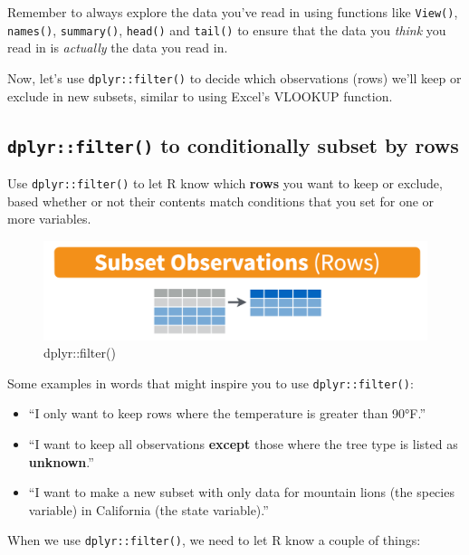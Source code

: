 \documentclass[]{book}
\providecommand{\tightlist}{%
  \setlength{\itemsep}{0pt}\setlength{\parskip}{0pt}}
\begin{document}
Remember to always explore the data you've read in using functions like \texttt{View()}, \texttt{names()}, \texttt{summary()}, \texttt{head()} and \texttt{tail()} to ensure that the data you \emph{think} you read in is \emph{actually} the data you read in.

Now, let's use \texttt{dplyr::filter()} to decide which observations (rows) we'll keep or exclude in new subsets, similar to using Excel's VLOOKUP function.

\hypertarget{dplyrfilter-to-conditionally-subset-by-rows}{%
\subsection{\texorpdfstring{\texttt{dplyr::filter()} to conditionally subset by rows}{dplyr::filter() to conditionally subset by rows}}\label{dplyrfilter-to-conditionally-subset-by-rows}}

Use \texttt{dplyr::filter()} to let R know which \textbf{rows} you want to keep or exclude, based whether or not their contents match conditions that you set for one or more variables.

\begin{figure}
\centering
\includegraphics{img/rstudio-cheatsheet-filter.png}
\caption{dplyr::filter()}
\end{figure}

Some examples in words that might inspire you to use \texttt{dplyr::filter()}:

\begin{itemize}
\tightlist
\item
  ``I only want to keep rows where the temperature is greater than 90°F.''
\item
  ``I want to keep all observations \textbf{except} those where the tree type is listed as \textbf{unknown}.''
\item
  ``I want to make a new subset with only data for mountain lions (the species variable) in California (the state variable).''
\end{itemize}

When we use \texttt{dplyr::filter()}, we need to let R know a couple of things:
\end{document}
